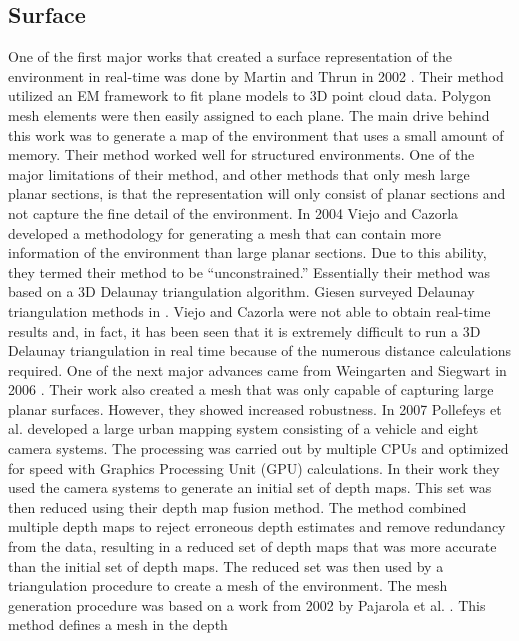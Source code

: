 \subsection{Surface}

One of the first major works that created a surface representation of the
environment in real-time was done by Martin and Thrun in 2002 \cite{Martin2002}.
Their method utilized an EM framework to fit plane models to 3D point cloud
data. Polygon mesh elements were then easily assigned to each plane. The main
drive behind this work was to generate a map of the environment that uses a
small amount of memory. Their  method worked well for structured environments.
One of the major limitations of their method, and other methods that only mesh
large planar sections, is that the representation will only consist of planar
sections and not capture the fine detail of the environment. In 2004 Viejo and
Cazorla \cite{Viejo2004} developed a methodology for generating a mesh that can
contain more information of the environment than large planar sections. Due to
this ability, they termed their method to be ``unconstrained.'' Essentially
their method was based on a 3D Delaunay triangulation algorithm. Giesen surveyed
Delaunay triangulation methods in \cite{Giesen2004}. Viejo and Cazorla were not
able to obtain real-time results and, in fact, it has been seen that it is
extremely difficult to run a 3D Delaunay triangulation in real time because of
the numerous distance calculations required. One of the next major advances came
from Weingarten and Siegwart in 2006 \cite{Weingarten2006}. Their work also
created a mesh that was only capable of capturing large planar surfaces.
However, they showed increased robustness. In 2007 Pollefeys et al.
\cite{Akbarzadeh2006,Pollefeys2007} developed a large urban mapping system
consisting of a vehicle and eight camera systems. The processing was carried out
by multiple CPUs and optimized for speed with Graphics Processing Unit (GPU)
calculations. In their work they used the camera systems to generate an initial
set of depth maps. This set was then reduced using their depth map fusion
method. The method combined multiple depth maps to reject erroneous depth
estimates and remove redundancy from the data, resulting in a reduced set of
depth maps that was more accurate than the initial set of depth maps. The
reduced set was then used by a triangulation procedure to create a mesh of the
environment. The mesh generation procedure was based on a work from 2002 by
Pajarola et al. \cite{Pajarola2002}. This method defines a mesh in the depth
